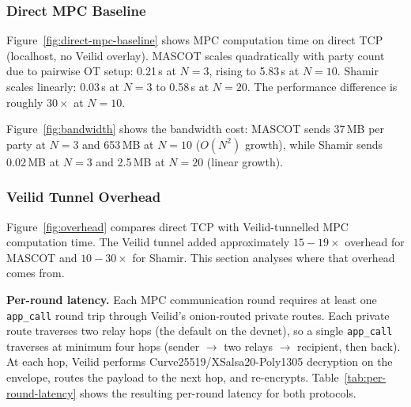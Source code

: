 

\subsubsection{Direct MPC Baseline}

Figure~\ref{fig:direct-mpc-baseline} shows MPC computation time on direct
TCP (localhost, no Veilid overlay).  MASCOT scales quadratically with party
count due to pairwise OT setup: 0.21\,s at $N{=}3$, rising to 5.83\,s at
$N{=}10$.  Shamir scales linearly: 0.03\,s at $N{=}3$ to 0.58\,s at
$N{=}20$.  The performance difference is roughly $30\times$ at $N{=}10$.

Figure~\ref{fig:bandwidth} shows the bandwidth cost: MASCOT sends 37\,MB per
party at $N{=}3$ and 653\,MB at $N{=}10$ ($O(N^2)$ growth), while Shamir
sends 0.02\,MB at $N{=}3$ and 2.5\,MB at $N{=}20$ (linear growth).

\subsubsection{Veilid Tunnel Overhead}

Figure~\ref{fig:overhead} compares direct TCP with Veilid-tunnelled MPC
computation time.  The Veilid tunnel added approximately $15{-}19\times$
overhead for MASCOT and $10{-}30\times$ for Shamir.  This section analyses
where that overhead comes from.

\textbf{Per-round latency.}  Each MPC communication round requires at least
one \texttt{app\_call} round trip through Veilid's onion-routed private routes.
Each private route traverses two relay hops (the default on the devnet), so a
single \texttt{app\_call} traverses at minimum four hops (sender $\to$ two
relays $\to$ recipient, then back).  At each hop, Veilid performs
Curve25519/XSalsa20-Poly1305 decryption on the envelope, routes the payload
to the next hop, and re-encrypts.  Table~\ref{tab:per-round-latency} shows
the resulting per-round latency for both protocols.

